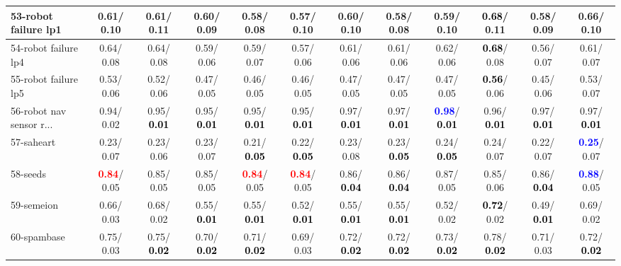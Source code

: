 \begin{table}[h]
\begin{center}
{\begin{tabular}{lc|c|c|c|c|c|c|c|c|c|c}
53-robot failure lp1 &   0.61/  0.10 &   0.61/  0.11 &   0.60/  0.09 &   0.58/  0.08 &   0.57/  0.10 &   0.60/  0.10 &   0.58/  0.08 &   0.59/  0.10 & \textcolor{black}{\textbf{  0.68}}/  0.11 &   0.58/  0.09 &   0.66/  0.10 \\ \hline
54-robot failure lp4 &   0.64/  0.08 &   0.64/  0.08 &   0.59/  0.06 &   0.59/  0.07 &   0.57/  0.06 &   0.61/  0.06 &   0.61/  0.06 &   0.62/  0.06 & \textcolor{black}{\textbf{  0.68}}/  0.08 &   0.56/  0.07 &   0.61/  0.07 \\
55-robot failure lp5 &   0.53/  0.06 &   0.52/  0.06 &   0.47/  0.05 &   0.46/  0.05 &   0.46/  0.05 &   0.47/  0.05 &   0.47/  0.05 &   0.47/  0.05 & \textcolor{black}{\textbf{  0.56}}/  0.06 &   0.45/  0.06 &   0.53/  0.07 \\
56-robot nav sensor r... &   0.94/  0.02 &   0.95/\textcolor{black}{\textbf{  0.01}} &   0.95/\textcolor{black}{\textbf{  0.01}} &   0.95/\textcolor{black}{\textbf{  0.01}} &   0.95/\textcolor{black}{\textbf{  0.01}} &   0.97/\textcolor{black}{\textbf{  0.01}} &   0.97/\textcolor{black}{\textbf{  0.01}} & \textcolor{blue}{\textbf{  0.98}}/\textcolor{black}{\textbf{  0.01}} &   0.96/\textcolor{black}{\textbf{  0.01}} &   0.97/\textcolor{black}{\textbf{  0.01}} &   0.97/\textcolor{black}{\textbf{  0.01}} \\
57-saheart &   0.23/  0.07 &   0.23/  0.06 &   0.23/  0.07 &   0.21/\textcolor{black}{\textbf{  0.05}} &   0.22/\textcolor{black}{\textbf{  0.05}} &   0.23/  0.08 &   0.23/\textcolor{black}{\textbf{  0.05}} &   0.24/\textcolor{black}{\textbf{  0.05}} &   0.24/  0.07 &   0.22/  0.07 & \textcolor{blue}{\textbf{  0.25}}/  0.07 \\
58-seeds & \textcolor{red}{\textbf{  0.84}}/  0.05 &   0.85/  0.05 &   0.85/  0.05 & \textcolor{red}{\textbf{  0.84}}/  0.05 & \textcolor{red}{\textbf{  0.84}}/  0.05 &   0.86/\textcolor{black}{\textbf{  0.04}} &   0.86/\textcolor{black}{\textbf{  0.04}} &   0.87/  0.05 &   0.85/  0.06 &   0.86/\textcolor{black}{\textbf{  0.04}} & \textcolor{blue}{\textbf{  0.88}}/  0.05 \\
59-semeion &   0.66/  0.03 &   0.68/  0.02 &   0.55/\textcolor{black}{\textbf{  0.01}} &   0.55/\textcolor{black}{\textbf{  0.01}} &   0.52/\textcolor{black}{\textbf{  0.01}} &   0.55/\textcolor{black}{\textbf{  0.01}} &   0.55/\textcolor{black}{\textbf{  0.01}} &   0.52/  0.02 & \textcolor{black}{\textbf{  0.72}}/  0.02 &   0.49/\textcolor{black}{\textbf{  0.01}} &   0.69/  0.02 \\
60-spambase &   0.75/  0.03 &   0.75/\textcolor{black}{\textbf{  0.02}} &   0.70/\textcolor{black}{\textbf{  0.02}} &   0.71/\textcolor{black}{\textbf{  0.02}} &   0.69/  0.03 &   0.72/\textcolor{black}{\textbf{  0.02}} &   0.72/\textcolor{black}{\textbf{  0.02}} &   0.73/\textcolor{black}{\textbf{  0.02}} &   0.78/\textcolor{black}{\textbf{  0.02}} &   0.71/  0.03 &   0.72/\textcolor{black}{\textbf{  0.02}} \\ \hline

\end{tabular}}
\end{center}
\end{table}
